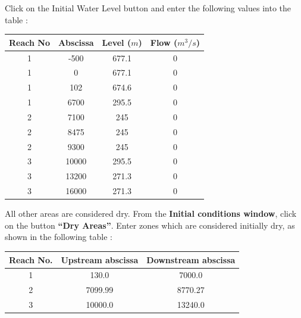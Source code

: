 \documentclass[a4paper,12pt]{article}
\begin{document}
\newpage

Click on the Initial Water Level button and enter the following values
into the table : 

\vspace{0.5cm}

\begin{table}[h]

\begin{center}

\begin{tabular}{|c|c|c|c|}
\hline 
Reach No & Abscissa & Level ($m$) & Flow ($m^3/s$)\tabularnewline
\hline 
\hline 
1 & -500 & 677.1 & 0\tabularnewline
\hline 
1 & 0 & 677.1 & 0\tabularnewline
\hline
1 & 102 & 674.6 & 0\tabularnewline
\hline
1 & 6700 & 295.5 & 0\tabularnewline
\hline
2 & 7100 & 245 & 0\tabularnewline
\hline
2 & 8475 & 245 & 0\tabularnewline
\hline 
2 & 9300 & 245 & 0\tabularnewline
\hline
3 & 10000 & 295.5 & 0\tabularnewline
 \hline
3 & 13200 & 271.3 & 0\tabularnewline
\hline 
3 & 16000 & 271.3 & 0\tabularnewline
\hline 
\end{tabular}

\end{center}

\end{table}

\vspace{0.5cm}

All other areas are considered dry. From the \textbf{Initial conditions window}, click on the button \textbf{{}``Dry
Areas''}. Enter zones which are considered initially dry, as shown in the following table :

\vspace{0.5cm}

\begin{table}[h]
 
\begin{center}

\begin{tabular}{|c|c|c|}
\hline 
Reach No. & Upstream abscissa & Downstream abscissa\tabularnewline
\hline 
\hline 
1 & 130.0 & 7000.0\tabularnewline
\hline 
2 & 7099.99 & 8770.27\tabularnewline
\hline 
3 & 10000.0 & 13240.0\tabularnewline
\hline 
\end{tabular}

\end{center}

\end{table}

\vspace{0.5cm}
\end{document}
